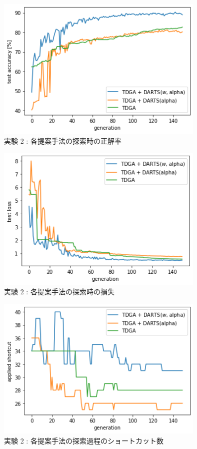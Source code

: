 \begin{figure}[t]
  \begin{center}
    \includegraphics[clip,width=10cm]{./fig/04.exp/acc.png}
  \end{center}
  \caption{実験 2 : 各提案手法の探索時の正解率}
  \label{fig:exp2/acc}
\end{figure}
\begin{figure}[t]
  \begin{center}
    \includegraphics[clip,width=10cm]{./fig/04.exp/loss.png}
  \end{center}
  \caption{実験 2 : 各提案手法の探索時の損失}
  \label{fig:exp2/loss}
\end{figure}
\begin{figure}[t]
  \begin{center}
    \includegraphics[clip,width=10cm]{./fig/04.exp/edge.png}
  \end{center}
  \caption{実験 2 : 各提案手法の探索過程のショートカット数}
  \label{fig:exp2/edge}
\end{figure}

